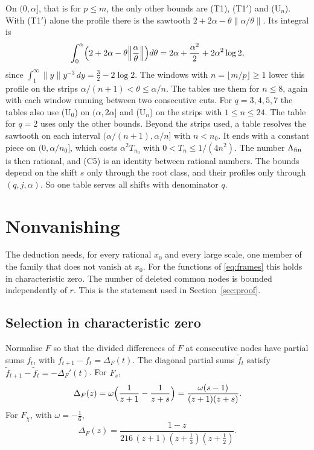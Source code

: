 \documentclass[11pt]{amsart}
\theoremstyle{definition}
\theoremstyle{remark}
\numberwithin{equation}{section}
\begin{document}
On $(0,\alpha]$, that is for $p\le m$, the only other bounds are (T1), (T1$'$) and (U$_n$). With (T1$'$) alone the
profile there is the sawtooth $2+2\alpha-\theta\|\alpha/\theta\|$. Its integral is
\[
 \int_0^\alpha\Bigl(2+2\alpha-\theta\Bigl\|\frac\alpha\theta\Bigr\|\Bigr)d\theta=2\alpha+\frac{\alpha^2}2+2\alpha^2\log2,
\]
since $\int_1^\infty\|y\|y^{-3}\,dy=\frac32-2\log2$. The windows with $n=\lfloor m/p\rfloor\ge1$ lower this profile on the
strips $\alpha/(n+1)<\theta\le\alpha/n$. The tables use them for $n\le8$, again with each window running between two
consecutive cuts. For $q=3,4,5,7$ the tables also use (U$_0$) on $(\alpha,2\alpha]$ and (U$_n$) on the strips with
$1\le n\le24$. The table for $q=2$ uses only the other bounds. Beyond the strips used, a table resolves the sawtooth on each
interval $(\alpha/(n+1),\alpha/n]$ with $n<n_0$. It ends with a constant piece on $(0,\alpha/n_0]$, which costs $\alpha^2T_{n_0}$ with
$0<T_n\le1/(4n^2)$. The number $\Lambda_{\rm fin}$ is then rational, and (C5) is an identity between rational numbers.
The bounds depend on the shift $s$ only through the root class, and their profiles only through $(q,j,\alpha)$. So one
table serves all shifts with denominator $q$.

\section{Nonvanishing}\label{sec:nonvanishing}

The deduction needs, for every rational $x_0$ and every large scale, one member of the family that does not vanish at
$x_0$. For the functions of \eqref{eq:frames} this holds in characteristic zero. The number of deleted common nodes is
bounded independently of $r$. This is the statement used in Section~\ref{sec:proof}.

\subsection{Selection in characteristic zero}\label{ssec:selection}
Normalise $F$ so that the divided differences of $F$ at consecutive nodes have partial sums $f_t$, with
$f_{t+1}-f_t=\Delta_F(t)$. The diagonal partial sums $\tilde f_t$ satisfy $\tilde f_{t+1}-\tilde f_t=-\Delta_F'(t)$. For
$F_s$,
\[
 \Delta_F(z)=\omega\Bigl(\frac1{z+1}-\frac1{z+s}\Bigr)=\frac{\omega(s-1)}{(z+1)(z+s)} .
\]
For $F_\chi$, with $\omega=-\frac16$,
\[
 \Delta_F(z)=\frac{1-z}{216\,(z+1)(z+\frac13)(z+\frac12)} .
\]
\end{document}
